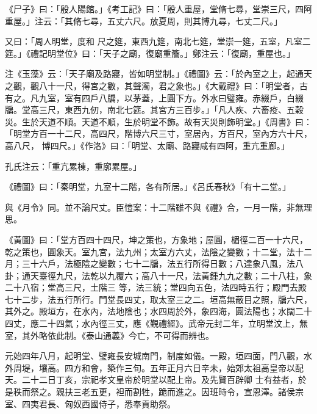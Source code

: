 \begin{pinyinscope}
 《尸子》曰：「殷人陽館。」《考工記》曰：「殷人重屋，堂脩七尋，堂崇三尺，四阿重屋。」注云：「其脩七尋，五丈六尺。放夏周，則其博九尋，七丈二尺。」



 又曰：「周人明堂，度和
 尺之筵，東西九筵，南北七筵，堂崇一筵，五室，凡室二筵。」《禮記明堂位》曰：「天子之廟，復廟重簷。」鄭注云：「復廟，重屋也。」



 注《玉藻》云：「天子廟及路寢，皆如明堂制。」《禮圖》云：「於內室之上，起通天之觀，觀八十一尺，得宮之數，其聲濁，君之象也。」《大戴禮》曰：「明堂者，古有之。凡九室，室有四戶八牖，以茅蓋，上圓下方。外水曰璧雍。赤綴戶，白綴牖。堂高三尺，東西九仞，南北七筵。其宮方三百步。」「凡人疾、六畜疫、五穀災。生於天道不順。天道不順，生於明堂不飾。故有天災則飾明堂。」《周書》曰：「明堂方百一十二尺，高四尺，階博六尺三寸，室居內，方百尺，室內方六十尺，高八尺，
 博四尺。」《作洛》曰：「明堂、太廟、路寢咸有四阿，重亢重廊。」



 孔氏注云：「重亢累棟，重廓累屋。」



 《禮圖》曰：「秦明堂，九室十二階，各有所居。」《呂氏春秋》「有十二堂。」



 與《月令》同。並不論尺丈。臣愷案：十二階雖不與《禮》合，一月一階，非無理思。



 《黃圖》曰：「堂方百四十四尺，坤之策也，方象地；屋圓，楣徑二百一十六尺，乾之策也，圓象天。室九宮，法九州；太室方六丈，法陰之變數；十二堂，法十二月；三十六戶，法極陰之變數；七十二牖，法五行所得日數；八達象八風，法八卦；通天臺徑九尺，法乾以九覆六；高八十一尺，法黃鍾九九之數；二十八柱，象二十八宿；堂高三尺，土階三
 等，法三統；堂四向五色，法四時五行；殿門去殿七十二步，法五行所行。門堂長四丈，取太室三之二。垣高無蔽目之照，牖六尺，其外之。殿垣方，在水內，法地陰也；水四周於外，象四海，圓法陽也；水闊二十四丈，應二十四氣；水內徑三丈，應《覲禮經》。武帝元封二年，立明堂汶上，無室，其外略依此制。《泰山通義》今亡，不可得而辨也。



 元始四年八月，起明堂、璧雍長安城南門，制度如儀。一殿，垣四面，門八觀，水外周堤，壤高。四方和會，築作三旬。五年正月六日辛未，始郊太祖高皇帝以配天。二十二日丁亥，宗祀孝文皇帝於明堂以配上帝。及先賢百辟卿
 士有益者，於是秩而祭之。親扶三老五更，袒而割牲，跪而進之。因班時令，宣恩澤。諸侯宗室、四夷君長、匈奴西國侍子，悉奉貢助祭。




\end{pinyinscope}
